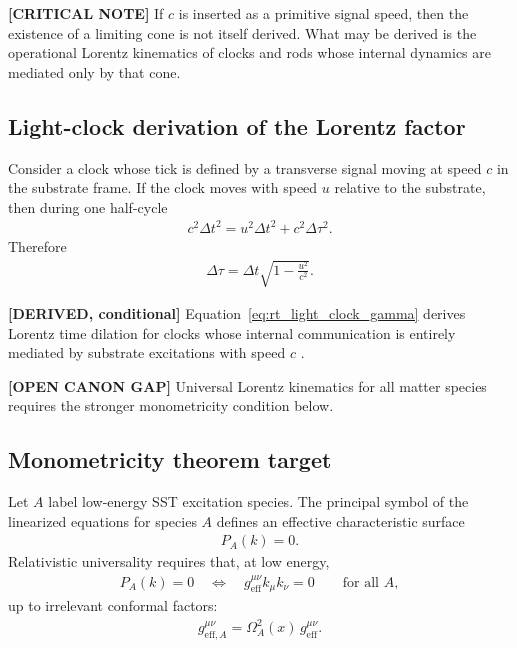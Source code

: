 \textbf{[CRITICAL NOTE]} If \(c\) is inserted as a primitive signal speed, then
the existence of a limiting cone is not itself derived. What may be derived is
the operational Lorentz kinematics of clocks and rods whose internal dynamics
are mediated only by that cone.

\subsection{Light-clock derivation of the Lorentz factor}

Consider a clock whose tick is defined by a transverse signal moving at speed
\(c\) in the substrate frame. If the clock moves with speed \(u\) relative to
the substrate, then during one half-cycle
\begin{align}
    c^2 \Delta t^2
    =
    u^2 \Delta t^2 + c^2 \Delta \tau^2 .
\end{align}
Therefore
\begin{align}
    \Delta \tau
    =
    \Delta t
    \sqrt{1-\frac{u^2}{c^2}} .
    \label{eq:rt_light_clock_gamma}
\end{align}

\textbf{[DERIVED, conditional]} Equation~\eqref{eq:rt_light_clock_gamma}
derives Lorentz time dilation for clocks whose internal communication is
entirely mediated by substrate excitations with speed \(c\) \cite{Einstein1905}.

\textbf{[OPEN CANON GAP]} Universal Lorentz kinematics for all matter species
requires the stronger monometricity condition below.

\subsection{Monometricity theorem target}

Let \(A\) label low-energy SST excitation species. The principal symbol of the
linearized equations for species \(A\) defines an effective characteristic
surface
\begin{align}
    P_A(k)=0 .
\end{align}
Relativistic universality requires that, at low energy,
\begin{align}
    P_A(k)=0
    \quad\Longleftrightarrow\quad
    g_{\mathrm{eff}}^{\mu\nu} k_\mu k_\nu=0
    \qquad
    \text{for all } A ,
    \label{eq:rt_monometricity}
\end{align}
up to irrelevant conformal factors:
\begin{align}
    g^{\mu\nu}_{\mathrm{eff},A}
    =
    \Omega_A^2(x)\,
    g^{\mu\nu}_{\mathrm{eff}} .
\end{align}

